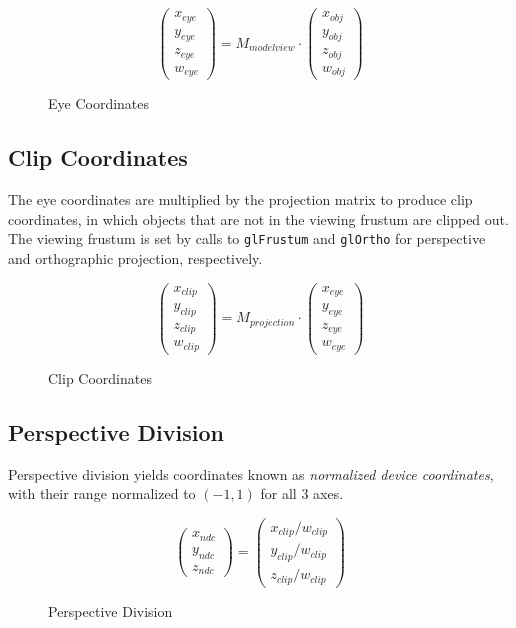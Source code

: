 \documentclass[letterpaper,10pt]{article}
\begin{document}
\begin{figure}[h!]
\[
\begin{pmatrix}
x_{eye} \\
y_{eye} \\
z_{eye} \\
w_{eye}
\end{pmatrix}
= M_{modelview} \cdot
\begin{pmatrix}
x_{obj} \\
y_{obj} \\
z_{obj} \\
w_{obj}
\end{pmatrix}
\]
\caption{Eye Coordinates}
\end{figure}

\subsection{Clip Coordinates}
The eye coordinates are multiplied by the projection matrix to produce clip coordinates, in which objects that are not in the viewing frustum are clipped out. The viewing frustum is set by calls to \verb!glFrustum! and \verb!glOrtho! for perspective and orthographic projection, respectively. \\
\begin{figure}[h!]
\[
\begin{pmatrix}
x_{clip} \\
y_{clip} \\
z_{clip} \\
w_{clip}
\end{pmatrix}
= M_{projection} \cdot
\begin{pmatrix}
x_{eye} \\
y_{eye} \\
z_{eye} \\
w_{eye}
\end{pmatrix}
\]
\caption{Clip Coordinates}
\end{figure}

\subsection{Perspective Division}
Perspective division yields coordinates known as \emph{normalized device coordinates}, with their range normalized to $(-1,1)$ for all 3 axes.\\
\begin{figure}[h!]
\[
\begin{pmatrix}
x_{ndc} \\
y_{ndc} \\
z_{ndc}
\end{pmatrix}
=
\begin{pmatrix}
x_{clip}/w_{clip} \\
y_{clip}/w_{clip} \\
z_{clip}/w_{clip}
\end{pmatrix}
\]
\caption{Perspective Division}
\end{figure}
\end{document}
